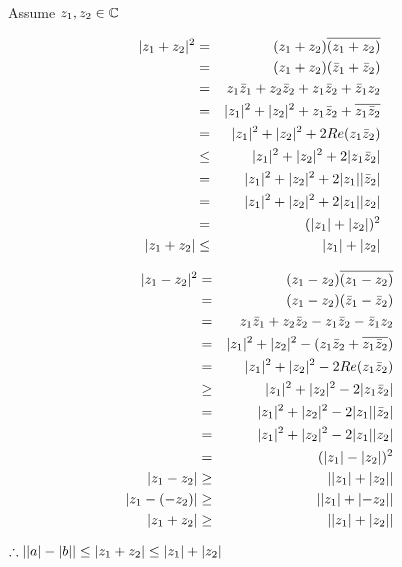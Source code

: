 \documentclass[letterpaper,12pt,fleqn]{article}
\newcommand{\conj}[1]{\bar{#1}}
\newcommand{\Conj}[1]{\overline{#1}}
\begin{document}
\begin{theproof}
  Assume $z_1,z_2\in\mathbb{C}$ \\
  \begin{minipage}[t]{3.25in}
    \begin{eqnarray*}
      \abs{z_1+z_2}^2 &=& (z_1+z_2)\Conj{(z_1+z_2)} \\
      &=& (z_1+z_2)(\conj{z}_1+\conj{z}_2) \\
      &=& z_1\conj{z}_1+z_2\conj{z}_2+z_1\conj{z}_2+\conj{z}_1z_2 \\
      &=& \abs{z_1}^2+\abs{z_2}^2+z_1\conj{z}_2+\Conj{z_1\conj{z}_2} \\
      &=& \abs{z_1}^2+\abs{z_2}^2+2Re(z_1\conj{z}_2) \\
      &\le& \abs{z_1}^2+\abs{z_2}^2+2\abs{z_1\conj{z}_2} \\
      &=& \abs{z_1}^2+\abs{z_2}^2+2\abs{z_1}\abs{\conj{z}_2} \\
      &=& \abs{z_1}^2+\abs{z_2}^2+2\abs{z_1}\abs{z_2} \\
      &=& (\abs{z_1}+\abs{z_2})^2 \\
      \abs{z_1+z_2} &\le& \abs{z_1}+\abs{z_2} \\
    \end{eqnarray*}
  \end{minipage}
  \begin{minipage}[t]{3.25in}
    \begin{eqnarray*}
      \abs{z_1-z_2}^2 &=& (z_1-z_2)\Conj{(z_1-z_2)} \\
      &=& (z_1-z_2)(\conj{z}_1-\conj{z}_2) \\
      &=& z_1\conj{z}_1+z_2\conj{z}_2-z_1\conj{z}_2-\conj{z}_1z_2 \\
      &=& \abs{z_1}^2+\abs{z_2}^2-(z_1\conj{z}_2+\Conj{z_1\conj{z}_2}) \\
      &=& \abs{z_1}^2+\abs{z_2}^2-2Re(z_1\conj{z}_2) \\
      &\ge& \abs{z_1}^2+\abs{z_2}^2-2\abs{z_1\conj{z}_2} \\
      &=& \abs{z_1}^2+\abs{z_2}^2-2\abs{z_1}\abs{\conj{z}_2} \\
      &=& \abs{z_1}^2+\abs{z_2}^2-2\abs{z_1}\abs{z_2} \\
      &=& (\abs{z_1}-\abs{z_2})^2 \\
      \abs{z_1-z_2} &\ge& \abs{\abs{z_1}+\abs{z_2}} \\
      \abs{z_1-(-z_2)} &\ge& \abs{\abs{z_1}+\abs{-z_2}} \\
      \abs{z_1+z_2} &\ge& \abs{\abs{z_1}+\abs{z_2}} \\
    \end{eqnarray*}
  \end{minipage}

  $\therefore\lvert\lvert a\rvert-\lvert b\rvert\rvert\le\lvert z_1+z_2\rvert\le\lvert z_1\rvert+\lvert z_2\rvert$
\end{theproof}
\end{document}
